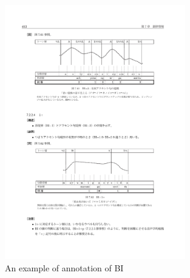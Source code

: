 \begin{figure}
 \centering
 \includegraphics[width=0.7\textwidth]{figure_BIex.pdf}
 \caption{An example of annotation of BI \cite[][412]{igarashietal06}}
 \label{BIexF}
\end{figure}


